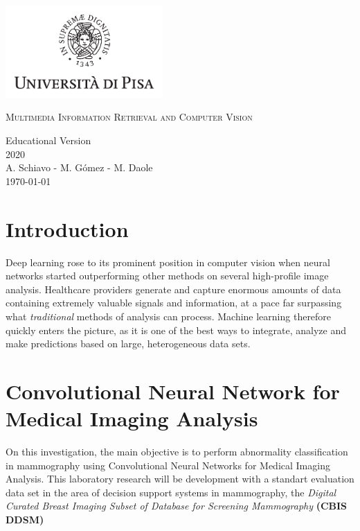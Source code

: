 \documentclass{book}
\begin{document}
    \begin{titlepage}
        \centering
        \includegraphics[width=6cm]{unipi.PNG}
        \vfill
        \vspace{1.5cm}
        {\huge\textsc{Multimedia Information Retrieval and Computer Vision}\par}
        {\Large
            Educational Version\\
            2020\\
            \vspace{2cm}
            A. Schiavo - M. Gómez - M. Daole \\
            \vspace{2cm}
            \today
        }    
        \vfill
        \vfill
    \end{titlepage}
    \tableofcontents


    \chapter{Introduction}

    Deep learning rose to its prominent position in computer vision when neural networks started outperforming other methods on several high-profile image analysis. Healthcare providers generate and capture enormous amounts of data containing extremely valuable signals and information, at a pace far surpassing what \textit{traditional} methods of analysis can process. Machine learning therefore quickly enters the picture, as it is one of the best ways to integrate, analyze and make predictions based on large, heterogeneous data sets. 



    \chapter{Convolutional Neural Network for Medical Imaging Analysis}

    On this investigation, the main objective is to perform abnormality classification in mammography using Convolutional Neural Networks for Medical Imaging Analysis. This laboratory research will be development with a standart evaluation data set in the area of decision support systems in mammography, the \textit{Digital Curated Breast Imaging Subset of Database for Screening Mammography} \textbf{(CBIS DDSM)}
    
\end{document}
